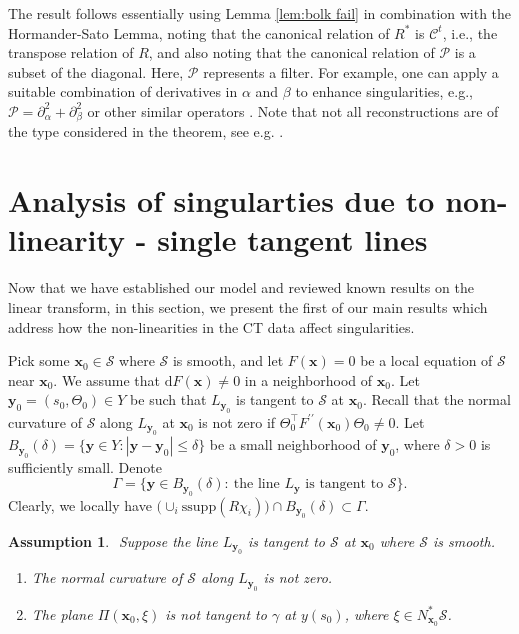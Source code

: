\documentclass[11pt]{article}
\newcommand{\be}{\begin{equation}}
\newcommand{\ee}{\end{equation}}
\newcommand{\s}{\mathcal S}
\newcommand{\pa}{\partial}
\newcommand{\bt}{\beta}
\newcommand{\al}{\alpha}
\newcommand{\dd}{\mathrm{d}}
\newcommand{\ga}{\gamma}
\newcommand{\de}{\delta}
\numberwithin{equation}{section}
\newcommand{\vy}{\mathbf{y}}
\newcommand{\vx}{\mathbf{x}}
\newcommand{\Cc}{\mathcal{C}}
\newtheorem{assumption}[theorem]{Assumption}
\theoremstyle{definition}
\begin{document}
The result follows essentially using Lemma \ref{lem:bolk fail} in combination with the Hormander-Sato Lemma, noting that the canonical relation of $R^*$ is $\Cc^t$, i.e., the transpose relation of $R$, and also noting that the canonical relation of $\mathcal{P}$ is a subset of the diagonal. Here, $\mathcal{P}$ represents a filter. For example, one can apply a suitable combination of derivatives in $\al$ and $\bt$ to enhance singularities, e.g., $\mathcal{P} = \pa_\al^2 +\pa_\bt^2$ or other similar operators \cite{luma, kat7, kat06a}. Note that not all reconstructions are of the type considered in the theorem, see e.g. \cite{Katsevich2002, Katsevich2004a}.


\section{Analysis of singularties due to non-linearity - single tangent lines}\label{sec:sing tang}
Now that we have established our model and {reviewed known} results on the linear transform, in this section, we present the first of our main results which address how the non-linearities in the CT data affect singularities. 

Pick some $\vx_0\in\s$ where $\s$ is smooth, and let $F(\vx)=0$ be a local equation of $\s$ near $\vx_0$. We assume that $\dd F(\vx)\neq0$ in a neighborhood of $\vx_0$. Let $\vy_0 = (s_0,\Theta_0) \in Y$ be such that $L_{\vy_0}$ is tangent to $\s$ at $\vx_0$. Recall that the normal curvature of $\s$ along $L_{\vy_0}$ at $\vx_0$ is not zero if $\Theta_0^{\top}F^{\prime\prime}(\vx_0)\Theta_0\neq 0$. Let $B_{\vy_0}(\delta) = \{\vy\in Y:|\vy - \vy_0| \leq \delta\}$ be a small neighborhood of $\vy_0$, where $\de>0$ is sufficiently small. Denote 
\be\label{Ga def}
\Gamma=\{\vy\in B_{\vy_0}(\delta):\ \text{the line $L_{\vy}$ is tangent to $\s$}\}.
\ee
Clearly, we locally have $\big(\cup_i \text{ssupp}(R\chi_i)\big)\cap B_{\vy_0}(\delta)\subset \Gamma$. 


\begin{assumption}\label{ass:sngl}$ $
Suppose the line $L_{\vy_0}$ is tangent to $\s$ at $\vx_0$ where $\s$ is smooth.
\begin{enumerate}[label=(\arabic*)]
\item\label{sng curv} The normal curvature of $\s$ along $L_{\vy_0}$ is not zero. 
\item\label{sng transv} The plane $\Pi(\vx_0,\xi)$ is not tangent to $\ga$ at $y(s_0)$, where $\xi\in N_{\vx_0}^*\s$.
\end{enumerate}
\end{assumption}
\end{document}
